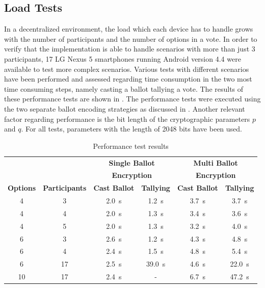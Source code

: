 \documentclass[numbers=noenddot, abstract=on, a4paper, headsepline,
footsepline, oneside, openright, draft=off, listof=leveldown]{scrreprt}
\begin{document}
\subsection{Load Tests}
\label{sec:loadtests}
In a decentralized environment, the load which each device has to handle grows
with the number of participants and the number of options in a vote. In order to
verify that the implementation is able to handle scenarios with more than just
3 participants, 17 LG Nexus 5 smartphones running Android version 4.4 were
available to test more complex scenarios. Various tests with different scenarios
have been performed and assessed regarding time consumption in the two most time
consuming steps, namely casting a ballot tallying a vote. The results of these
performance tests are shown in . The performance tests
were executed using the two separate ballot encoding strategies as discussed in
. Another relevant factor regarding performance is the
bit length of the cryptographic parameters $p$ and $q$. For all tests,
parameters with the length of 2048 bits have been used.

\begin{table}[htbp]
	\centering
	\renewcommand{\arraystretch}{1.4}
	\begin{minipage}{\linewidth}
	\begin{tabularx}{\textwidth}{cccccc}
		\toprule
		& & \multicolumn{2}{c}{\textbf{Single Ballot}} &
		\multicolumn{2}{c}{\textbf{Multi Ballot}} \\
		& & \multicolumn{2}{c}{\textbf{Encryption}} &
		\multicolumn{2}{c}{\textbf{Encryption}} \\
		\textbf{Options}	&  \textbf{Participants} & \textbf{Cast Ballot} &
		\textbf{Tallying} & \textbf{Cast Ballot} &	\textbf{Tallying}
		\\
		\midrule
		4 & 3 & \SI{2.0}{\second} & \SI{1.2}{\second} & \SI{3.7}{\second} & 
		\SI{3.7}{\second} \\
		4 & 4 & \SI{2.0}{\second} & \SI{1.3}{\second} & \SI{3.4}{\second} &	
		\SI{3.6}{\second} \\
		4 & 5 & \SI{2.0}{\second} & \SI{1.3}{\second} & \SI{3.2}{\second} & 
		\SI{4.0}{\second} \\
		6 & 3 & \SI{2.6}{\second} & \SI{1.2}{\second} & \SI{4.3}{\second} &	
		\SI{4.8}{\second} \\
		6 & 4 & \SI{2.4}{\second} & \SI{1.5}{\second} & \SI{4.8}{\second} &	
		\SI{5.4}{\second} \\
		6 & 17 & \SI{2.5}{\second} & \SI{39.0}{\second} & \SI{4.6}{\second} & 
		\SI{22.0}{\second} \\
		10 & 17 & \SI{2.4}{\second} & - & \SI{6.7}{\second} &	
		\SI{47.2}{\second} \\
		\bottomrule
	\end{tabularx}
	\end{minipage}
	\renewcommand{\arraystretch}{1}
	\caption{Performance test results}
	\label{tab:perftestresults}
\end{table}
\end{document}
